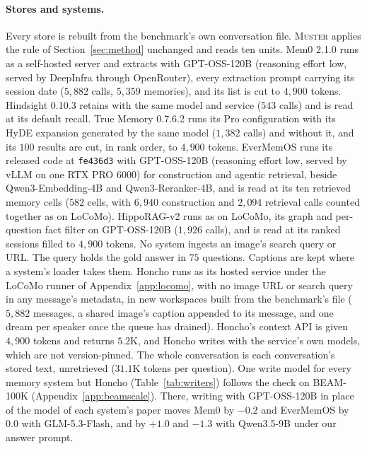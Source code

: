 \documentclass{article}
\newcommand{\sys}{\textsc{Muster}}
\begin{document}
\paragraph{Stores and systems.} Every store is rebuilt from the benchmark's own conversation file. \sys{} applies the rule of Section~\ref{sec:method} unchanged and reads ten units. Mem0 2.1.0 runs as a self-hosted server and extracts with GPT-OSS-120B (reasoning effort low, served by DeepInfra through OpenRouter), every extraction prompt carrying its session date ($5{,}882$ calls, $5{,}359$ memories), and its list is cut to $4{,}900$ tokens. Hindsight 0.10.3 retains with the same model and service ($543$ calls) and is read at its default recall. True Memory 0.7.6.2 runs its Pro configuration with its HyDE expansion generated by the same model ($1{,}382$ calls) and without it, and its $100$ results are cut, in rank order, to $4{,}900$ tokens. EverMemOS runs its released code at \texttt{fe436d3} with GPT-OSS-120B (reasoning effort low, served by vLLM on one RTX PRO 6000) for construction and agentic retrieval, beside Qwen3-Embedding-4B and Qwen3-Reranker-4B, and is read at its ten retrieved memory cells ($582$ cells, with $6{,}940$ construction and $2{,}094$ retrieval calls counted together as on LoCoMo). HippoRAG-v2 runs as on LoCoMo, its graph and per-question fact filter on GPT-OSS-120B ($1{,}926$ calls), and is read at its ranked sessions filled to $4{,}900$ tokens. No system ingests an image's search query or URL. The query holds the gold answer in $75$ questions. Captions are kept where a system's loader takes them. Honcho runs as its hosted service under the LoCoMo runner of Appendix~\ref{app:locomo}, with no image URL or search query in any message's metadata, in new workspaces built from the benchmark's file ($5{,}882$ messages, a shared image's caption appended to its message, and one dream per speaker once the queue has drained). Honcho's context API is given $4{,}900$ tokens and returns $5.2$K, and Honcho writes with the service's own models, which are not version-pinned. The whole conversation is each conversation's stored text, unretrieved ($31.1$K tokens per question). One write model for every memory system but Honcho (Table~\ref{tab:writers}) follows the check on BEAM-100K (Appendix~\ref{app:beamscale}). There, writing with GPT-OSS-120B in place of the model of each system's paper moves Mem0 by $-0.2$ and EverMemOS by $0.0$ with GLM-5.3-Flash, and by $+1.0$ and $-1.3$ with Qwen3.5-9B under our answer prompt.
\end{document}
